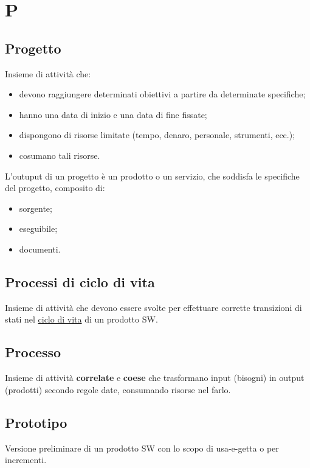 \section{P}

    \subsection{Progetto}
    \label{glossario:progetto}
    Insieme di attività che:
    \begin{itemize}
        \item devono raggiungere determinati obiettivi a partire da determinate specifiche;
        \item hanno una data di inizio e una data di fine fissate;
        \item dispongono di risorse limitate (tempo, denaro, personale, strumenti, ecc.);
        \item cosumano tali risorse.
    \end{itemize}
    L'outuput di un progetto è un prodotto o un servizio, che soddisfa le specifiche del progetto, composito di:
    \begin{itemize}
        \item sorgente;
        \item eseguibile;
        \item documenti.
    \end{itemize}

    \subsection{Processi di ciclo di vita}
    \label{glossario:processiciclodivita}
    Insieme di attività che devono essere svolte per effettuare corrette transizioni di stati nel \hyperref[glossario:ciclodivita]{ciclo di vita} di un prodotto SW.

    \subsection{Processo}
    \label{glossario:processo}
    Insieme di attività \textbf{correlate} e \textbf{coese} che trasformano input (bisogni) in output (prodotti) secondo regole date, consumando risorse nel farlo.

    \subsection{Prototipo}
    \label{glossario:prototipo}
    Versione preliminare di un prodotto SW con lo scopo di usa-e-getta o per incrementi.

